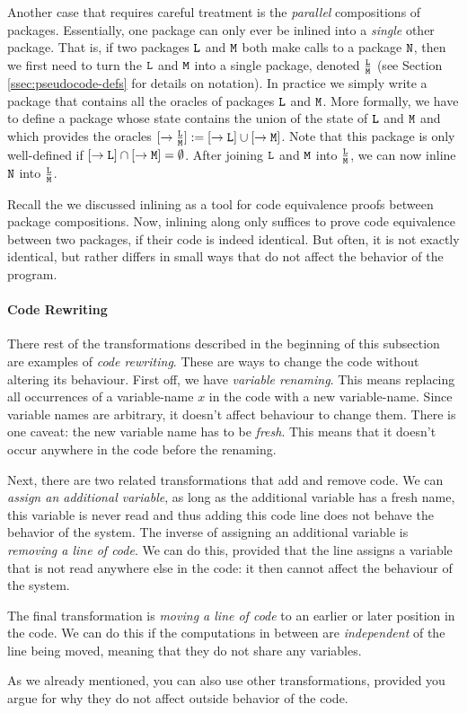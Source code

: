 Another case that requires careful treatment is the \emph{parallel} compositions of packages. Essentially, one package can only ever be inlined into a \emph{single} other package. That is, if two packages $\text{\texttt{L}}$ and $\text{\texttt{M}}$ both make calls to a package $\text{\texttt{N}}$, then we first need to turn the $\text{\texttt{L}}$ and $\text{\texttt{M}}$ into a single package, denoted $\tfrac{\text{\texttt{L}}}{\text{\texttt{M}}}$ (see Section \ref{ssec:pseudocode-defs} for details on notation). In practice we simply write a package that contains all the oracles of packages $\text{\texttt{L}}$ and $\text{\texttt{M}}$. More formally, we have to define a package whose state contains the union of the state of $\text{\texttt{L}}$ and $\text{\texttt{M}}$ and which provides the oracles $[\rightarrow\tfrac{\text{\texttt{L}}}{\text{\texttt{M}}}]:=[\rightarrow\text{\texttt{L}}]\cup[\rightarrow\text{\texttt{M}}]$. Note that this package is only well-defined if $[\rightarrow\text{\texttt{L}}]\cap[\rightarrow\text{\texttt{M}}]=\emptyset$. After joining $\text{\texttt{L}}$ and $\text{\texttt{M}}$ into $\tfrac{\text{\texttt{L}}}{\text{\texttt{M}}}$, we can now inline $\text{\texttt{N}}$ into $\tfrac{\text{\texttt{L}}}{\text{\texttt{M}}}$.

Recall the we discussed inlining as a tool for code equivalence proofs between package compositions. Now, inlining along only suffices to prove code equivalence between two packages, if their code is indeed identical. But often, it is not exactly identical, but rather differs in small ways that do not affect the behavior of the program.

\paragraph{Code Rewriting}
There rest of the transformations described in the beginning of this subsection are examples of \emph{code rewriting}. These are ways to change the code without altering its behaviour. First off, we have \emph{variable renaming}. This means replacing all occurrences of a variable-name $x$ in the code with a new variable-name. Since variable names are arbitrary, it doesn't affect behaviour to change them. There is one caveat: the new variable name has to be \emph{fresh}. This means that it doesn't occur anywhere in the code before the renaming.

Next, there are two related transformations that add and remove code. We can \emph{assign an additional variable}, as long as the additional variable has a fresh name, this variable is never read and thus adding this code line does not behave the behavior of the system. The inverse of assigning an additional variable is \emph{removing a line of code}. We can do this, provided that the line assigns a variable that is not read anywhere else in the code: it then cannot affect the behaviour of the system.

The final transformation is \emph{moving a line of code} to an earlier or later position in the code. We can do this if the computations in between are \emph{independent} of the line being moved, meaning that they do not share any variables.

As we already mentioned, you can also use other transformations, provided you argue for why they do not affect outside behavior of the code.